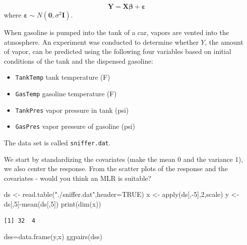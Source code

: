 \documentclass[
  letterpaper,
  DIV=11,
  numbers=noendperiod]{scrartcl}
\newenvironment{Shaded}{\begin{snugshade}}{\end{snugshade}}
\newcommand{\AttributeTok}[1]{\textcolor[rgb]{0.40,0.45,0.13}{#1}}
\newcommand{\ConstantTok}[1]{\textcolor[rgb]{0.56,0.35,0.01}{#1}}
\newcommand{\DecValTok}[1]{\textcolor[rgb]{0.68,0.00,0.00}{#1}}
\newcommand{\FunctionTok}[1]{\textcolor[rgb]{0.28,0.35,0.67}{#1}}
\newcommand{\NormalTok}[1]{\textcolor[rgb]{0.00,0.23,0.31}{#1}}
\newcommand{\OtherTok}[1]{\textcolor[rgb]{0.00,0.23,0.31}{#1}}
\newcommand{\SpecialCharTok}[1]{\textcolor[rgb]{0.37,0.37,0.37}{#1}}
\newcommand{\StringTok}[1]{\textcolor[rgb]{0.13,0.47,0.30}{#1}}
\providecommand{\tightlist}{%
  \setlength{\itemsep}{0pt}\setlength{\parskip}{0pt}}\usepackage{longtable,booktabs,array}
\begin{document}
\[\mathbf{Y} = \mathbf{X}\mathbf{\beta} + \boldsymbol{\varepsilon}\]
where \(\boldsymbol{\varepsilon}\sim N(\mathbf{0},\sigma^2\mathbf{I})\).

When gasoline is pumped into the tank of a car, vapors are vented into
the atmosphere. An experiment was conducted to determine whether \(Y\),
the amount of vapor, can be predicted using the following four variables
based on initial conditions of the tank and the dispensed gasoline:

\begin{itemize}
\tightlist
\item
  \texttt{TankTemp} tank temperature (F)
\item
  \texttt{GasTemp} gasoline temperature (F)
\item
  \texttt{TankPres} vapor pressure in tank (psi)
\item
  \texttt{GasPres} vapor pressure of gasoline (psi)
\end{itemize}

The data set is called \texttt{sniffer.dat}.

We start by standardizing the covariates (make the mean 0 and the
variance 1), we also center the response. From the scatter plots of the
response and the covariates - would you think an MLR is suitable?

\begin{Shaded}
\begin{Highlighting}[]
\NormalTok{ds }\OtherTok{\textless{}{-}} \FunctionTok{read.table}\NormalTok{(}\StringTok{"./sniffer.dat"}\NormalTok{,}\AttributeTok{header=}\ConstantTok{TRUE}\NormalTok{)}
\NormalTok{x }\OtherTok{\textless{}{-}} \FunctionTok{apply}\NormalTok{(ds[,}\SpecialCharTok{{-}}\DecValTok{5}\NormalTok{],}\DecValTok{2}\NormalTok{,scale)}
\NormalTok{y }\OtherTok{\textless{}{-}}\NormalTok{ ds[,}\DecValTok{5}\NormalTok{]}\SpecialCharTok{{-}}\FunctionTok{mean}\NormalTok{(ds[,}\DecValTok{5}\NormalTok{])}
\FunctionTok{print}\NormalTok{(}\FunctionTok{dim}\NormalTok{(x))}
\end{Highlighting}
\end{Shaded}

\begin{verbatim}
[1] 32  4
\end{verbatim}

\begin{Shaded}
\begin{Highlighting}[]
\NormalTok{dss}\OtherTok{=}\FunctionTok{data.frame}\NormalTok{(y,x)}
\FunctionTok{ggpairs}\NormalTok{(dss)}
\end{Highlighting}
\end{Shaded}
\end{document}
